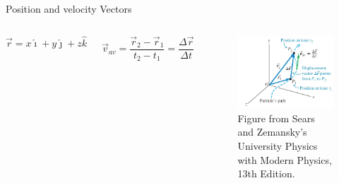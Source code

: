 \documentclass[]{beamer}
\begin{document}

\begin{frame}
    Position and velocity Vectors
    \vspace{3mm}
 
    \begin{columns}[c]
        \column{2in}  %
       
        \begin{equation}
          \vec{r}=x\hat{\imath}+y\hat{\jmath}+z\hat{k}
         \end{equation}
         \vspace{3mm}
      

        \begin{equation}
            \vec{v}_{av}=\frac{\vec{r}_2-\vec{r}_1}{t_2-t_1}=\frac{\Delta \vec{r}}{\Delta{t}}
        \end{equation}
     
        \vspace{3mm}
     
        
    
        \column{2.5in}
        
        \begin{figure}[h!]  
       \includegraphics[width=1.\textwidth]{images/8.jpg}
        \caption{ {\tiny Figure from Sears and Zemansky's University Physics 
        with Modern Physics, 13th Edition.} }
     \end{figure}
     
     
     
        \end{columns}
    
\end{frame}
\end{document}
